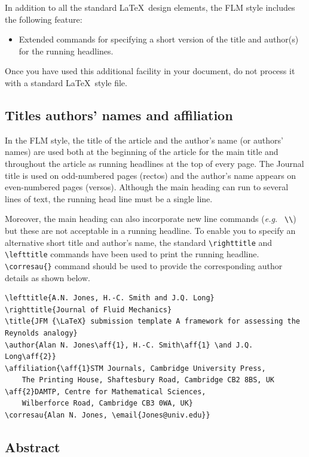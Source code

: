 \documentclass[lineno]{JFM-FLM_Au}
\begin{document}
In addition to all the standard LaTeX\ design elements, the FLM style
includes the following feature:
\begin{itemize}
  \item Extended commands for specifying a short version
        of the title and author(s) for the running
        headlines.
\end{itemize}
Once you have used this additional facility in your document,
do not process it with a standard LaTeX\ style file.

\subsection{Titles authors' names and affiliation}

In the FLM style, the title of the article and the author's name (or authors'
names) are used both at the beginning of the article for the main title and
throughout the article as running headlines at the top of every page.
The Journal title is used on odd-numbered pages (rectos) and the author's name appears
on even-numbered pages (versos).
Although the main heading can run to several lines of text, the running head
line must be a single line.

Moreover, the main heading can also incorporate new line commands
({\it e.g.\ } \verb"\\") but these are not acceptable in a running headline.
To enable you to specify an alternative short title and author's name, the
standard \verb"\righttitle" and \verb"\lefttitle" commands have been used to print the running headline.
\verb"\corresau{}" command should be used to provide the corresponding author details as shown below.
%
\begin{verbatim}
\lefttitle{A.N. Jones, H.-C. Smith and J.Q. Long}
\righttitle{Journal of Fluid Mechanics}
\title{JFM {\LaTeX} submission template A framework for assessing the
Reynolds analogy}
\author{Alan N. Jones\aff{1}, H.-C. Smith\aff{1} \and J.Q. Long\aff{2}}
\affiliation{\aff{1}STM Journals, Cambridge University Press,
    The Printing House, Shaftesbury Road, Cambridge CB2 8BS, UK
\aff{2}DAMTP, Centre for Mathematical Sciences,
    Wilberforce Road, Cambridge CB3 0WA, UK}
\corresau{Alan N. Jones, \email{Jones@univ.edu}}
\end{verbatim}
%

\subsection{Abstract}
\end{document}
